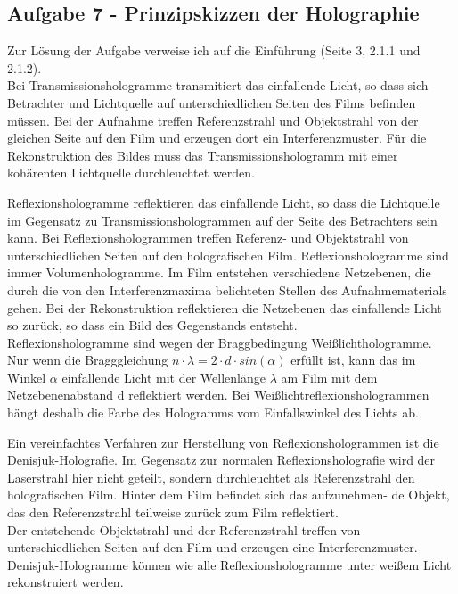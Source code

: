 \subsection*{Aufgabe 7 - Prinzipskizzen der Holographie}
Zur Lösung der Aufgabe verweise ich auf die Einführung (Seite 3, 2.1.1 und 2.1.2). \\
Bei Transmissionshologramme transmitiert das einfallende Licht, so dass sich Betrachter und Lichtquelle auf unterschiedlichen Seiten des Films befinden müssen. Bei der Aufnahme treffen Referenzstrahl und Objektstrahl von der gleichen Seite auf den Film und erzeugen dort ein Interferenzmuster. Für die Rekonstruktion des Bildes muss das Transmissionshologramm mit einer kohärenten Lichtquelle durchleuchtet werden.


Reflexionshologramme reflektieren das einfallende Licht, so dass die Lichtquelle im Gegensatz zu Transmissionshologrammen auf der Seite des Betrachters sein kann. Bei Reflexionshologrammen treffen Referenz- und Objektstrahl von unterschiedlichen Seiten auf den holografischen Film. Reflexionshologramme sind immer Volumenhologramme. Im Film entstehen verschiedene Netzebenen, die durch die von den Interferenzmaxima belichteten Stellen des Aufnahmematerials gehen. Bei der Rekonstruktion reflektieren die Netzebenen das einfallende Licht so zurück, so dass ein Bild des Gegenstands entsteht.\\
Reflexionshologramme sind wegen der Braggbedingung Weißlichthologramme. Nur wenn die Bragggleichung $n \cdot \lambda = 2 \cdot d \cdot sin \left( \alpha \right)$ erfüllt ist, kann das im Winkel $\alpha$ einfallende Licht mit der Wellenlänge $\lambda$ am Film mit dem Netzebenenabstand d reflektiert werden. Bei Weißlichtreflexionshologrammen hängt deshalb die Farbe des Hologramms vom Einfallswinkel des Lichts ab.


Ein vereinfachtes Verfahren zur Herstellung von Reflexionshologrammen ist die Denisjuk-Holografie. Im Gegensatz zur normalen Reflexionsholografie wird der Laserstrahl hier nicht geteilt, sondern durchleuchtet als Referenzstrahl den holografischen Film.
Hinter dem Film befindet sich das aufzunehmen- de Objekt, das den Referenzstrahl teilweise zurück zum Film reflektiert.\\
Der entstehende Objektstrahl und der Referenzstrahl treffen von unterschiedlichen Seiten auf den Film und erzeugen eine Interferenzmuster. Denisjuk-Hologramme können wie alle Reflexionshologramme unter weißem Licht rekonstruiert werden.

